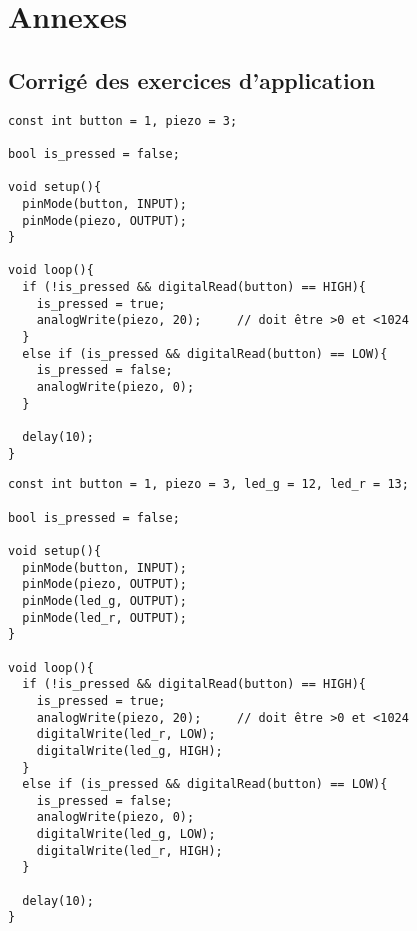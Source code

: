 \section{Annexes}

\subsection{Corrigé des exercices d'application}




\begin{tcolorbox}[colback=yellow-atelier!10, colframe=gray!70!black, coltitle=black, colbacktitle=gray!70!white, title={\textit{Envie de buzzer...}}, leftrule=2mm]
\begin{small}
\begin{verbatim}
const int button = 1, piezo = 3;

bool is_pressed = false;

void setup(){
  pinMode(button, INPUT);
  pinMode(piezo, OUTPUT);
}

void loop(){  
  if (!is_pressed && digitalRead(button) == HIGH){
    is_pressed = true;
  	analogWrite(piezo, 20); 	// doit être >0 et <1024
  }
  else if (is_pressed && digitalRead(button) == LOW){
    is_pressed = false;
  	analogWrite(piezo, 0);
  }
  
  delay(10);
}
\end{verbatim}
\end{small}
\end{tcolorbox}

\begin{tcolorbox}[colback=yellow-atelier!10, colframe=gray!70!black, coltitle=black, colbacktitle=gray!70!white, title={\textit{Que la lumière soit !}}, leftrule=2mm]
\begin{small}
\begin{verbatim}
const int button = 1, piezo = 3, led_g = 12, led_r = 13;

bool is_pressed = false;

void setup(){
  pinMode(button, INPUT);
  pinMode(piezo, OUTPUT);
  pinMode(led_g, OUTPUT);
  pinMode(led_r, OUTPUT);
}

void loop(){
  if (!is_pressed && digitalRead(button) == HIGH){
    is_pressed = true;
  	analogWrite(piezo, 20); 	// doit être >0 et <1024
    digitalWrite(led_r, LOW);
    digitalWrite(led_g, HIGH);
  }
  else if (is_pressed && digitalRead(button) == LOW){
    is_pressed = false;
  	analogWrite(piezo, 0);
    digitalWrite(led_g, LOW);
    digitalWrite(led_r, HIGH);
  }
  
  delay(10);
}
\end{verbatim}
\end{small}
\end{tcolorbox}

